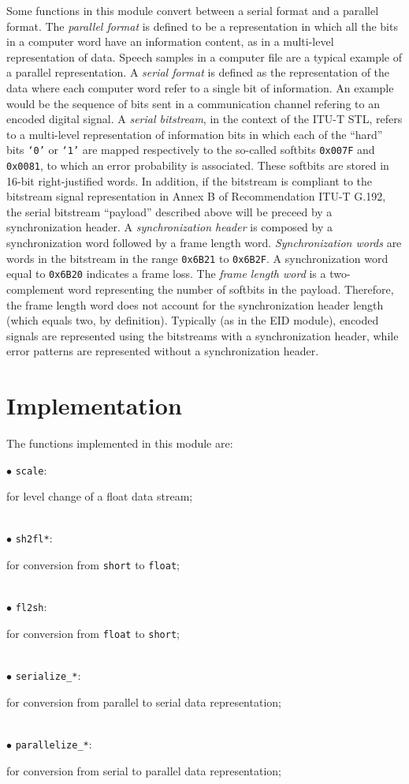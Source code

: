 Some functions in this module convert between a serial format and a
parallel format. The {\em parallel format} is defined to be a
representation in which all the bits in a computer word have an
information content, as in a multi-level representation of
data. Speech samples in a computer file are a typical example of a
parallel representation. A {\em serial format} is defined as the
representation of the data where each computer word refer to a single
bit of information. An example would be the sequence of bits sent in a
communication channel refering to an encoded digital signal. A {\em
serial bitstream}, in the context of the ITU-T STL, refers to a
multi-level representation of information bits in which each of the
``hard'' bits {\tt `0'} or {\tt `1'} are mapped respectively to the
so-called softbits {\tt 0x007F} and {\tt 0x0081}, to which an error
probability is associated. These softbits are stored in 16-bit
right-justified words.
In addition, if the bitstream is compliant to the bitstream signal representation in Annex B of Recommendation ITU-T G.192, the serial bitstream ``payload'' described above will be preceed by a synchronization header. A {\em synchronization header} is composed by a synchronization word followed by a frame length word.
{\em Synchronization words} are words in the bitstream in the
range {\tt 0x6B21} to {\tt 0x6B2F}. A synchronization word equal to
{\tt 0x6B20} indicates a frame loss. The {\em frame length word} is a
two-complement word representing the number of softbits in the
payload. Therefore, the frame length word does not account for the
synchronization header length (which equals two, by definition).
Typically (as in the EID module), encoded signals are represented
using the bitstreams with a synchronization header, while error
patterns are represented without a synchronization header.

\section{Implementation}

The functions implemented in this module are:

\begin{minipage}{150mm}
$\bullet$ {\tt scale}: \dotfill \parbox[t]{105mm}{
                       for level change of a float data stream;}\\
$\bullet$ {\tt sh2fl*}: \dotfill \parbox[t]{105mm}{
                       for conversion from {\tt short} to {\tt float};}\\
$\bullet$ {\tt fl2sh}: \dotfill \parbox[t]{105mm}{
                       for conversion from {\tt float} to {\tt short};}\\
$\bullet$ {\tt serialize\_*}: \dotfill \parbox[t]{105mm}{
                       for conversion from parallel to serial
                       data representation;}\\
$\bullet$ {\tt parallelize\_*}: \dotfill \parbox[t]{105mm}{
                       for conversion from serial to parallel
                       data representation;}
\end{minipage}

